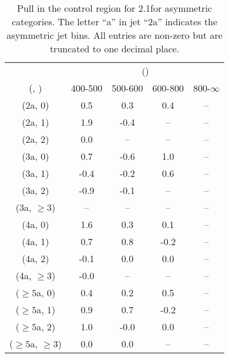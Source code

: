 \begin{table}[h!]
\tiny
\centering
\caption{Pull in the \gj control region for 2.1\ifb for asymmetric categories. The letter ``a'' in jet \eg ``2a''  indicates the asymmetric jet bins. All entries are non-zero but are truncated to one decimal place.\label{tab:pullsepnaive_gj_ewk_asym}}
\begin{tabular}
{ccccc}
	\hline\hline
	& \multicolumn{4}{c}{\scalht (\gev)} \\ 
	 (\njet,  \nb) & 400-500 & 500-600 & 600-800 & 800-$\infty$ \\ [0.8ex] 
\hline
	(2a, 0) & 0.5 & 0.3 & 0.4 & -- \\[0.5ex] 
	(2a, 1) & 1.9 & -0.4 & -- & -- \\[0.5ex] 
	(2a, 2) & 0.0 & -- & -- & -- \\[0.5ex] 
	(3a, 0) & 0.7 & -0.6 & 1.0 & -- \\[0.5ex] 
	(3a, 1) & -0.4 & -0.2 & 0.6 & -- \\[0.5ex] 
	(3a, 2) & -0.9 & -0.1 & -- & -- \\[0.5ex] 
	(3a, $\ge3$) & -- & -- & -- & -- \\[0.5ex] 
	(4a, 0) & 1.6 & 0.3 & 0.1 & -- \\[0.5ex] 
	(4a, 1) & 0.7 & 0.8 & -0.2 & -- \\[0.5ex] 
	(4a, 2) & -0.1 & 0.0 & 0.0 & -- \\[0.5ex] 
	(4a, $\ge3$) & -0.0 & -- & -- & -- \\[0.5ex] 
	($\ge5$a, 0) & 0.4 & 0.2 & 0.5 & -- \\[0.5ex] 
	($\ge5$a, 1) & 0.9 & 0.7 & -0.2 & -- \\[0.5ex] 
	($\ge5$a, 2) & 1.0 & -0.0 & 0.0 & -- \\[0.5ex] 
	($\ge5$a, $\ge3$) & 0.0 & 0.0 & -- & -- \\[0.5ex] 
	\hline
	\hline
\end{tabular}
\end{table}
